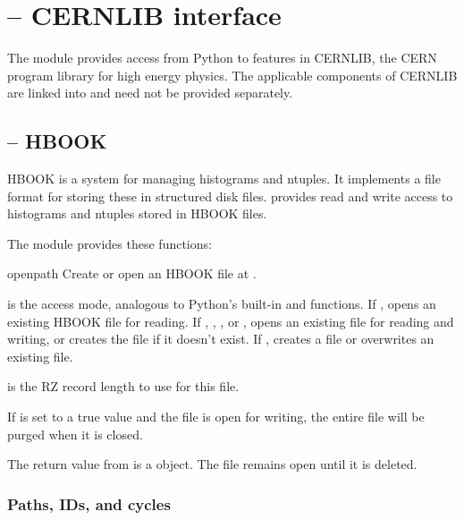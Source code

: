 \section{ -- CERNLIB interface}


The  module provides access from Python to features
in CERNLIB, the CERN program library for high energy physics.  The
applicable components of CERNLIB are linked into \pyhep and need not be
provided separately.

\subsection{ -- HBOOK}


HBOOK is a system for managing histograms and ntuples.  It implements a
file format for storing these in structured disk files.  \pyhep provides
read and write access to histograms and ntuples stored in HBOOK files.

The module  provides these functions:

\begin{funcdesc}{open}{path}
 Create or open an HBOOK file at .  

  is the access mode, analogous to Python's built-in
  and  functions.  If , opens an
 existing HBOOK file for reading.  If , ,
 , or , opens an existing file for reading and
 writing, or creates the file if it doesn't exist.  If ,
 creates a file or overwrites an existing file.

  is the RZ record length to use for this file.  

 If  is set to a true value and the file is open for
 writing, the entire file will be purged when it is closed.
\end{funcdesc}

The return value from  is a  object.  The
file remains open until it is deleted.  

\subsubsection{Paths, IDs, and cycles}

